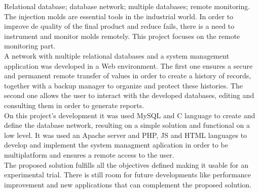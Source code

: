 \documentclass[11pt,twoside,a4paper]{report}
\begin{document}
\TitlePage
  \vspace*{55mm}
  {Relational database; database network; multiple databases; remote monitoring.}
  {The injection molds are essential tools in the industrial world. In order to improve de quality of the final product and reduce fails, there is a need to instrument and monitor molds remotely. This project focuses on the remote monitoring part.\\
  A network with multiple relational databases and a system management application was developed in a Web environment. The first one ensures a secure and permanent remote transfer of values in order to create a history of records, together with a backup manager to organize and protect these histories. The second one allows the user to interact with the developed databases, editing and consulting them in order to generate reports.\\
  On this project's development it was used MySQL and C language to create and define the database network, resulting on a simple solution and functional on a low level. It was used an Apache server and PHP, JS and HTML languages to develop and implement the system managment aplication in order to be multiplatform and ensures a remote access to the user.\\
  The proposed solution fulfills all the objectives defined making it usable for an experimental trial. There is still room for future developments like performance improvement and new applications that can complement the proposed solution.}
\EndTitlePage
\titlepage\ \endtitlepage %


%
%

\tableofcontents

\cleardoublepage
\listoffigures

\cleardoublepage
\listoftables



\cleardoublepage
{}
\end{document}
